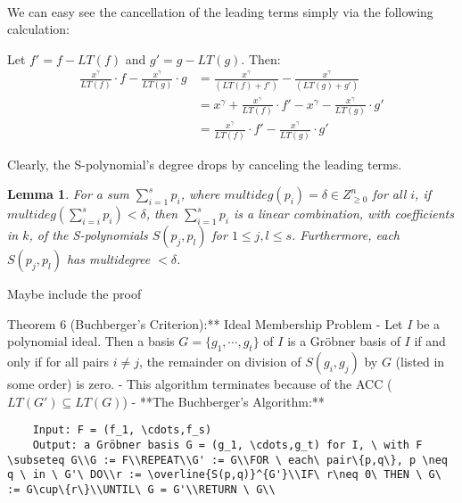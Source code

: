 \documentclass{article}
\newtheorem{lemma}[theorem]{Lemma}
\theoremstyle{definition}
\theoremstyle{remark}
\theoremstyle{example}
\begin{document}
\paragraph{  }
We can easy see the cancellation of the leading terms simply via the following calculation:

Let $f' = f - LT(f)$ and $g' = g - LT(g)$. Then:
\begin{align}
    \tfrac{x^{\gamma}}{LT(f)} \cdot f - \tfrac{x^{\gamma}}{LT(g)} \cdot g &= \tfrac{x^{\gamma}}{(LT(f) + f')} - \tfrac{x^{\gamma}}{(LT(g) + g')}\\
    &= x^{\gamma} + \tfrac{x^{\gamma}}{LT(f)} \cdot f' - x^{\gamma} - \tfrac{x^{\gamma}}{LT(g)} \cdot g'\\
    &= \tfrac{x^{\gamma}}{LT(f)} \cdot f' - \tfrac{x^{\gamma}}{LT(g)} \cdot g' 
\end{align}

Clearly, the S-polynomial's degree drops by canceling the leading terms.

\begin{lemma}
    For a sum $\sum_{i = 1}^{s}{p_i}$, where $multideg(p_i) = \delta \in Z_{\geq0}^{n}$ for all $i$, if $multideg(\sum_{i = i}^{s}{p_i}) < \delta$, then $\sum_{i = 1}^{s}{p_i}$ is a linear combination, with coefficients in $k$, of the S-polynomials $S(p_j, p_l)$ for $1 \leq j,l \leq s$. Furthermore, each $S(p_j, p_l)$ has multidegree $< \delta$.
\end{lemma}

\textcolor{BrickRed}{Maybe include the proof}

Theorem 6 (Buchberger's Criterion):** Ideal Membership Problem
    - Let $I$ be a polynomial ideal. Then a basis $G = \{g_1, \cdots, g_t\}$ of $I$ is a Gröbner basis of $I$ if and only if for all pairs $i \neq j$, the remainder on division of $S(g_i, g_j)$ by $G$ (listed in some order) is zero.
        - This algorithm terminates because of the ACC ($LT(G') \subseteq LT(G)$)
- **The Buchberger's Algorithm:**

\begin{verbatim}
    Input: F = (f_1, \cdots,f_s)
    Output: a Gröbner basis G = (g_1, \cdots,g_t) for I, \ with F \subseteq G\\G := F\\REPEAT\\G' := G\\FOR \ each\ pair\{p,q\}, p \neq q \ in \ G'\ DO\\r := \overline{S(p,q)}^{G'}\\IF\ r\neq 0\ THEN \ G\ := G\cup\{r\}\\UNTIL\ G = G'\\RETURN \ G\\
\end{verbatim}
\end{document}
